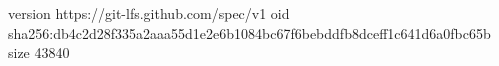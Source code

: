 version https://git-lfs.github.com/spec/v1
oid sha256:db4c2d28f335a2aaa55d1e2e6b1084bc67f6bebddfb8dceff1c641d6a0fbc65b
size 43840
